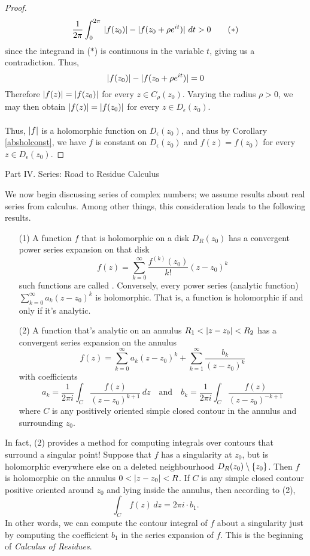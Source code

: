 \begin{proof}
\[\frac{1}{2\pi}\int_0^{2\pi}\, \left\lvert f(z_0)\right\rvert - |f(z_0 + \rho e^{it})|\ dt > 0\tag{$*$}\]
since the integrand in ($*$) is continuous in the variable $t$, giving us a contradiction. Thus, 
\[\left\lvert f(z_0)\right\rvert - |f(z_0 + \rho e^{it})| = 0\]
Therefore $\left\lvert f(z)\right\rvert = \left\lvert f(z_0)\right\rvert$ for every $z \in C_\rho(z_0)$. Varying the radius $\rho > 0$, we may then obtain $\left\lvert f(z)\right\rvert = \left\lvert f(z_0)\right\rvert$ for every $z \in D_\epsilon(z_0)$.\\
\\
Thus, $\left\lvert f\right\rvert$ is a holomorphic function on $D_\epsilon(z_0)$, and thus by Corollary \ref{absholconst}, we have $f$ is constant on $D_\epsilon(z_0)$ and $f(z) = f(z_0)$ for every $z \in D_\epsilon(z_0)$.
\end{proof}

\vspace*{2em}

\begin{mdframed}[backgroundcolor=paleyellow,linewidth=1pt]
\begin{center}
{\sc\Large Part IV. Series: Road to Residue Calculus}
\end{center}
\end{mdframed}

\begin{discussion}
We now begin discussing series of complex numbers; we assume results about real series from calculus. Among other things, this consideration leads to the following results.
\begin{itemize}[itemsep=1em]
\item[(1)] A function $f$ that is holomorphic on a disk $D_R(z_0)$ has a convergent power series expansion on that disk
\[f(z) = \sum_{k=0}^\infty\frac{f^{(k)}(z_0)}{k!}(z - z_0)^k\]
such functions are called . Conversely, every power series (analytic function) $\sum_{k=0}^\infty a_k(z - z_0)^k$ is holomorphic. That is, a function is holomorphic if and only if it's analytic. 
\item[(2)] A function that's analytic on an annulus $R_1 < \left\lvert z - z_0\right\rvert < R_2$ has a convergent series expansion on the annulus
\[f(z) = \sum_{k=0}^\infty a_k(z - z_0)^k + \sum_{k=1}^\infty\frac{b_k}{(z - z_0)^k}\]
with coefficients
\[a_k = \frac{1}{2\pi i}\int_C\frac{f(z)}{(z - z_0)^{k+1}}\,dz \quad \text{and} \quad b_k = \frac{1}{2\pi i}\int_C\frac{f(z)}{(z - z_0)^{-k+1}}\]
where $C$ is any positively oriented simple closed contour in the annulus and surrounding $z_0$. 
\end{itemize}
In fact, (2) provides a method for computing integrals over contours that surround a singular point! Suppose that $f$ has a singularity at $z_0$, but is holomorphic everywhere else on a deleted neighbourhood $D_R(z_0)\setminus\left\{z_0\right\}$. Then $f$ is holomorphic on the annulus $0 < \left\lvert z - z_0\right\rvert < R$. If $C$ is any simple closed contour positive oriented around $z_0$ and lying inside the annulus, then according to (2), 
\[\int_C\, f(z)\,dz = 2\pi i\cdot b_1.\]
In other words, we can compute the contour integral of $f$ about a singularity just by computing the coefficient $b_1$ in the series expansion of $f$. This is the beginning of \emph{Calculus of Residues}.
\end{discussion}


